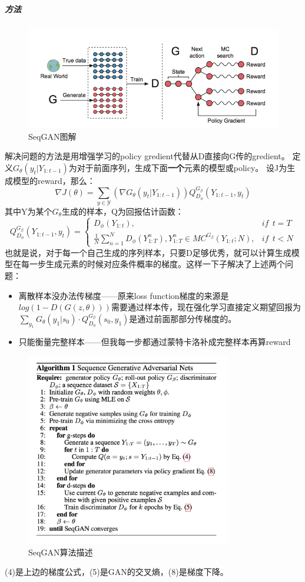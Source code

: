 \documentclass[a4paper]{article}
\begin{document}
\subparagraph{方法}
\begin{figure}
\centering
\includegraphics[width=\textwidth]{./img/24.png}
\caption{SeqGAN图解}
\label{fig:24}
\end{figure}解决问题的方法是用增强学习的policy gredient代替从D直接向G传的gredient。
定义$G_\theta(y_t|Y_{1:t-1})$为对于前面序列，生成下面\textbf{一个}元素的模型或policy。
设J为生成模型的reward，那么：
$$\nabla J(\theta)=\sum\limits_{y\in \mathcal{Y}}(\nabla G_\theta(y_t|Y_{1:t-1}))Q_{D_\phi}^{G_\beta}(Y_{1:t-1},y_t)$$
其中Y为某个$G_\theta$生成的样本，Q为回报估计函数：
$$Q_{D_\phi}^{G_\beta}(Y_{1:t-1},y_t)=\left\{
\begin{aligned}
D_\phi(Y_{1:t}),& if \ \ t=T\\
\frac{1}{N}\sum\limits^N_{n=1}D_\phi(Y_{1:T}^n), Y^n_{1:T} \in MC^{G_\beta}(Y_{1:t};N), & if \ \ t < N
\end{aligned}
\right.$$
也就是说，对于每一个自己生成的序列样本，只要D足够优秀，就可以计算生成模型在每一步生成元素的时候对应条件概率的梯度。这样一下子解决了上述两个问题：
\begin{itemize}

\item 离散样本没办法传梯度——原来loss function梯度的来源是$log(1-D(G(z,\theta)))$需要通过样本传，现在强化学习直接定义期望回报为$\sum_{y_1} G_\theta(y_1|s_0)\cdot Q_{D_\phi}^{G_\beta}(s_0, y_1)$是通过前面那部分传梯度的。
\item 只能衡量完整样本——但我每一步都通过蒙特卡洛补成完整样本再算reward
\end{itemize}
\begin{figure}
\centering
\includegraphics[width=0.8\textwidth]{./img/25.png}
\caption{SeqGAN算法描述}
\label{fig:25}
\end{figure}
(4)是上边的梯度公式，(5)是GAN的交叉熵，(8)是梯度下降。
\end{document}
